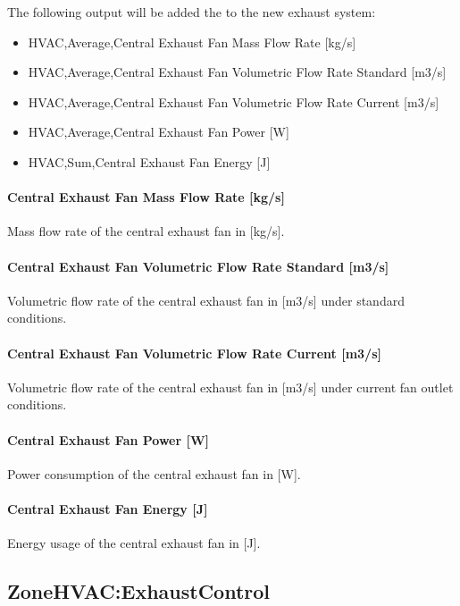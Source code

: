 The following output will be added the to the new exhaust system: 

\begin{itemize}

\item HVAC,Average,Central Exhaust Fan Mass Flow Rate {[}kg/s{]}
\item HVAC,Average,Central Exhaust Fan Volumetric Flow Rate Standard {[}m3/s{]}
\item HVAC,Average,Central Exhaust Fan Volumetric Flow Rate Current {[}m3/s{]}
\item HVAC,Average,Central Exhaust Fan Power {[}W{]}
\item HVAC,Sum,Central Exhaust Fan Energy {[}J{]}

\end{itemize}

\paragraph{Central Exhaust Fan Mass Flow Rate [kg/s]}
Mass flow rate of the central exhaust fan in [kg/s].

\paragraph{Central Exhaust Fan Volumetric Flow Rate Standard [m3/s]}
Volumetric flow rate of the central exhaust fan in [m3/s] under standard conditions.

\paragraph{Central Exhaust Fan Volumetric Flow Rate Current [m3/s]}
Volumetric flow rate of the central exhaust fan in [m3/s] under current fan outlet conditions.

\paragraph{Central Exhaust Fan Power [W]}
Power consumption of the central exhaust fan in [W].

\paragraph{Central Exhaust Fan Energy [J]}
Energy usage of the central exhaust fan in [J].

\subsection{ZoneHVAC:ExhaustControl}

